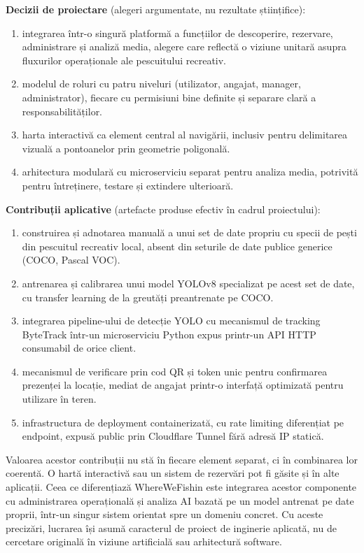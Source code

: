 \textbf{Decizii de proiectare} (alegeri argumentate, nu rezultate științifice):
\begin{enumerate}
  \item integrarea într-o singură platformă a funcțiilor de descoperire, rezervare, administrare și analiză media, alegere care reflectă o viziune unitară asupra fluxurilor operaționale ale pescuitului recreativ.
  \item modelul de roluri cu patru niveluri (utilizator, angajat, manager, administrator), fiecare cu permisiuni bine definite și separare clară a responsabilităților.
  \item harta interactivă ca element central al navigării, inclusiv pentru delimitarea vizuală a pontoanelor prin geometrie poligonală.
  \item arhitectura modulară cu microserviciu separat pentru analiza media, potrivită pentru întreținere, testare și extindere ulterioară.
\end{enumerate}

\textbf{Contribuții aplicative} (artefacte produse efectiv în cadrul proiectului):
\begin{enumerate}
  \item construirea și adnotarea manuală a unui set de date propriu cu specii de pești din pescuitul recreativ local, absent din seturile de date publice generice (COCO, Pascal VOC).
  \item antrenarea și calibrarea unui model YOLOv8 specializat pe acest set de date, cu transfer learning de la greutăți preantrenate pe COCO.
  \item integrarea pipeline-ului de detecție YOLO cu mecanismul de tracking ByteTrack într-un microserviciu Python expus printr-un API HTTP consumabil de orice client.
  \item mecanismul de verificare prin cod QR și token unic pentru confirmarea prezenței la locație, mediat de angajat printr-o interfață optimizată pentru utilizare în teren.
  \item infrastructura de deployment containerizată, cu rate limiting diferențiat pe endpoint, expusă public prin Cloudflare Tunnel fără adresă IP statică.
\end{enumerate}

Valoarea acestor contribuții nu stă în fiecare element separat, ci în combinarea lor coerentă. O hartă interactivă sau un sistem de rezervări pot fi găsite și în alte aplicații. Ceea ce diferențiază WhereWeFishin este integrarea acestor componente cu administrarea operațională și analiza AI bazată pe un model antrenat pe date proprii, într-un singur sistem orientat spre un domeniu concret. Cu aceste precizări, lucrarea își asumă caracterul de proiect de inginerie aplicată, nu de cercetare originală în viziune artificială sau arhitectură software.

